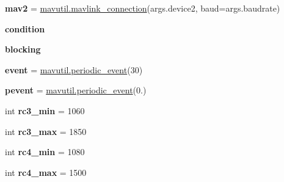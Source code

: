 \begin{DoxyCompactItemize}
{\bfseries mav2} = \hyperlink{namespacepymavlink_1_1mavutil_a021b0a1b1d488c0800662acaef819852}{mavutil.\+mavlink\+\_\+connection}(args.\+device2, baud=args.\+baudrate)
\item 
\mbox{\label{namespacepymavlink_1_1examples_1_1magtest_aca99d866c578887ca8b781563516bfc3}} 
{\bfseries condition}
\item 
\mbox{\label{namespacepymavlink_1_1examples_1_1magtest_a7f38ead3d29b80bee730a85adc717add}} 
{\bfseries blocking}
\item 
\mbox{\label{namespacepymavlink_1_1examples_1_1magtest_adea78a74209f350ecdcbc8517a7dd55c}} 
{\bfseries event} = \hyperlink{classpymavlink_1_1mavutil_1_1periodic__event}{mavutil.\+periodic\+\_\+event}(30)
\item 
\mbox{\label{namespacepymavlink_1_1examples_1_1magtest_a8556daa189241634467717d1fc5477d0}} 
{\bfseries pevent} = \hyperlink{classpymavlink_1_1mavutil_1_1periodic__event}{mavutil.\+periodic\+\_\+event}(0.)
\item 
\mbox{\label{namespacepymavlink_1_1examples_1_1magtest_af92d1c950ac101b69806b7714ce9ae92}} 
int {\bfseries rc3\+\_\+min} = 1060
\item 
\mbox{\label{namespacepymavlink_1_1examples_1_1magtest_ae1a1fcf76a0fd9a85b0047f91a164ba7}} 
int {\bfseries rc3\+\_\+max} = 1850
\item 
\mbox{\label{namespacepymavlink_1_1examples_1_1magtest_a2a2275c4bbdc823c8f895bb63e4039c7}} 
int {\bfseries rc4\+\_\+min} = 1080
\item 
\mbox{\label{namespacepymavlink_1_1examples_1_1magtest_a84113c17f1b736a0346be69f763dcd6e}} 
int {\bfseries rc4\+\_\+max} = 1500
\item 
\mbox{\label{namespacepymavlink_1_1examples_1_1magtest_a5f4f85280403824f4515003203b490b6}} 

\end{DoxyCompactItemize}
